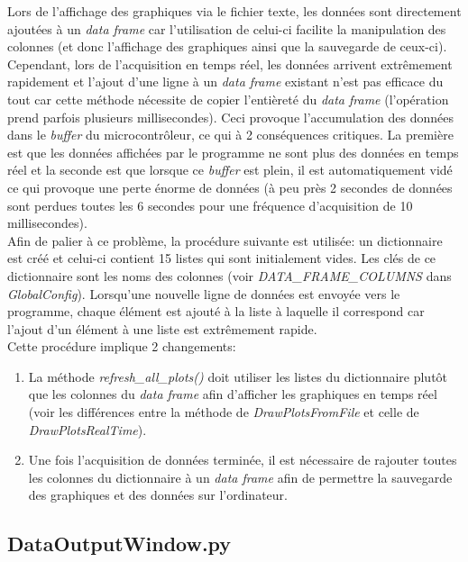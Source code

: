 Lors de l'affichage des graphiques via le fichier texte, les données sont directement ajoutées à un \textit{data frame} car l'utilisation de celui-ci facilite la manipulation des colonnes (et donc l'affichage des graphiques ainsi que la sauvegarde de ceux-ci).\\

Cependant, lors de l'acquisition en temps réel, les données arrivent extrêmement rapidement et l'ajout d'une ligne à un \textit{data frame} existant n'est pas efficace du tout car cette méthode nécessite de copier l'entièreté du \textit{data frame} (l'opération prend parfois plusieurs millisecondes). Ceci provoque l'accumulation des données dans le \textit{buffer} du microcontrôleur, ce qui à 2 conséquences critiques. La première est que les données affichées par le programme ne sont plus des données en temps réel et la seconde est que lorsque ce \textit{buffer} est plein, il est automatiquement vidé ce qui provoque une perte énorme de données (à peu près 2 secondes de données sont perdues toutes les 6 secondes pour une fréquence d'acquisition de 10 millisecondes).\\

Afin de palier à ce problème, la procédure suivante est utilisée: un dictionnaire est créé et celui-ci contient 15 listes qui sont initialement vides. Les clés de ce dictionnaire sont les noms des colonnes (voir \textit{DATA\_FRAME\_COLUMNS} dans \textit{GlobalConfig}). Lorsqu'une nouvelle ligne de données est envoyée vers le programme, chaque élément est ajouté à la liste à laquelle il correspond car l'ajout d'un élément à une liste est extrêmement rapide.\\

Cette procédure implique 2 changements: 
\begin{enumerate}
    \item La méthode \textit{refresh\_all\_plots()} doit utiliser les listes du dictionnaire plutôt que les colonnes du \textit{data frame} afin d'afficher les graphiques en temps réel (voir les différences entre la méthode de \textit{DrawPlotsFromFile} et celle de \textit{DrawPlotsRealTime}).
    
    \item Une fois l'acquisition de données terminée, il est nécessaire de rajouter toutes les colonnes du dictionnaire à un \textit{data frame} afin de permettre la sauvegarde des graphiques et des données sur l'ordinateur.
\end{enumerate}

\subsection{DataOutputWindow.py}

